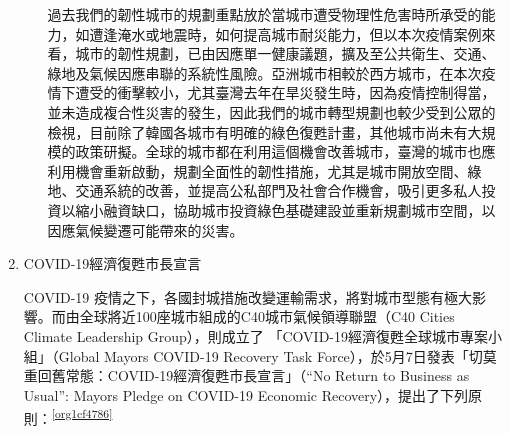 \documentclass[a4paper,12pt]{article}
\begin{document}
\begin{enumerate}
\begin{itemize}
過去我們的韌性城市的規劃重點放於當城市遭受物理性危害時所承受的能力，如遭逢淹水或地震時，如何提高城市耐災能力，但以本次疫情案例來看，城市的韌性規劃，已由因應單一健康議題，擴及至公共衛生、交通、綠地及氣候因應串聯的系統性風險。亞洲城市相較於西方城市，在本次疫情下遭受的衝擊較小，尤其臺灣去年在旱災發生時，因為疫情控制得當，並未造成複合性災害的發生，因此我們的城市轉型規劃也較少受到公眾的檢視，目前除了韓國各城市有明確的綠色復甦計畫，其他城市尚未有大規模的政策研擬。全球的城市都在利用這個機會改善城市，臺灣的城市也應利用機會重新啟動，規劃全面性的韌性措施，尤其是城市開放空間、綠地、交通系統的改善，並提高公私部門及社會合作機會，吸引更多私人投資以縮小融資缺口，協助城市投資綠色基礎建設並重新規劃城市空間，以因應氣候變遷可能帶來的災害。\\
\end{itemize}

\item COVID-19經濟復甦市長宣言
\label{sec:org4946b54}

COVID-19 疫情之下，各國封城措施改變運輸需求，將對城市型態有極大影響。而由全球將近100座城市組成的C40城市氣候領導聯盟（C40 Cities Climate Leadership Group），則成立了 「COVID-19經濟復甦全球城市專案小組」（Global Mayors COVID-19 Recovery Task Force），於5月7日發表「切莫重回舊常態：COVID-19經濟復甦市長宣言」（“No Return to Business as Usual”: Mayors Pledge on COVID-19 Economic Recovery），提出了下列原則：\textsuperscript{\ref{org1cf4786}}\\


\end{enumerate}
\end{document}
